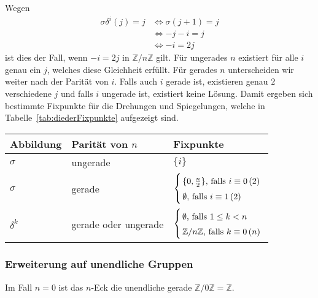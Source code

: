 \documentclass[12pt, german]{article}
\newcommand{\Z}{\mathbb{Z}}
\begin{document}
		Wegen
		\begin{align*}
			\sigma\delta^i(j)  = j &\iff \sigma(j+1)  = j  \\
		&\iff 	-j -i  = j \\
		&\iff 	-i  = 2j
		\end{align*} 
		ist dies der Fall, wenn $-i = 2j \textrm{ in } \mathbb Z /n \mathbb Z$ gilt. Für ungerades $n$ existiert für alle $i$ genau ein $j$, welches diese Gleichheit erfüllt. Für gerades $n$ unterscheiden wir weiter nach der Parität von $i$. Falls auch $i$ gerade ist, existieren genau $2$ verschiedene $j$ und falls $i$ ungerade ist, existiert keine Lösung. Damit ergeben sich bestimmte Fixpunkte für die Drehungen und Spiegelungen, welche in Tabelle~\ref{tab:diederFixpunkte} aufgezeigt sind.
		\begin{table*}[h]
			\centering
			\begin{tabular}{lll}
				\toprule[2pt]
				Abbildung & Parität von $n$ & Fixpunkte\\
				\midrule
				$\sigma$ & ungerade & $\{i\}$ \\
				\addlinespace
				$\sigma$ & gerade & $ \left \{
			
				\arraycolsep=1.4pt\def\arraystretch{1.5}
				\begin{array}{ll}
					\{0,\frac{n}{2}\}\textrm{, falls }i \equiv 0 \, (2)\\
					\emptyset\textrm{, falls } i \equiv 1\, (2)
				\end{array}
				\right. $ \\
				\addlinespace
				$\delta^k$ & gerade oder ungerade & $ \left \{
				\arraycolsep=1.4pt\def\arraystretch{1.5}
				\begin{array}{ll}
					\emptyset\textrm{, falls }1\leq k < n\\
					\Z/n\Z\textrm{, falls } k \equiv 0\, (n)
				\end{array}
				\right. $ \\
				\bottomrule[2pt]
			\end{tabular}
			\caption{Fixpunkte der Abbildungen in Diedergruppen.}
			\label{tab:diederFixpunkte}
		\end{table*}
		
		\subsubsection{Erweiterung auf unendliche Gruppen}
		
		Im Fall $n=0$ ist das $n$-Eck die unendliche gerade $\Z/0\Z = \Z$.
		
\end{document}
